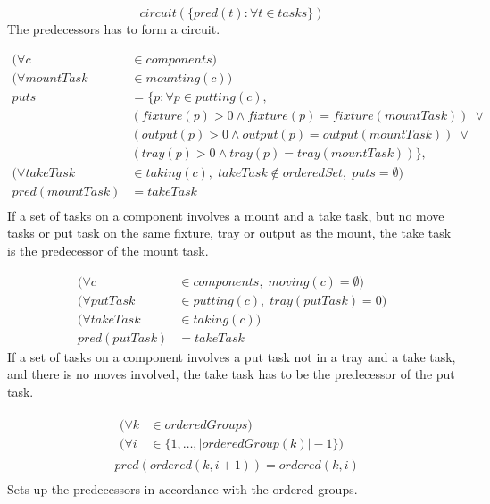  \begin{equation}\label{eq:111}
 circuit(\{pred(t) : \forall t \in tasks\})\end{equation}
 The predecessors has to form a circuit.
 
 \begin{equation}
 \begin{aligned}\label{eq:112}
 (\forall c &\in components) \\
 (\forall mountTask &\in mounting(c)) \\
 puts &= \{p : \forall p \in putting(c),\\
 &(fixture(p) > 0 \land fixture(p) = fixture(mountTask)) \; \lor  \\
 &(output(p) > 0 \land output(p) = output(mountTask)) \; \lor  \\
 &(tray(p) > 0 \land tray(p) = tray(mountTask))\}, \\
 (\forall takeTask &\in taking(c), \; takeTask \notin orderedSet, \; puts = \emptyset) \\
 pred(mountTask) &= takeTask \\
 \end{aligned}
 \end{equation}
 If a set of tasks on a component involves a mount and a take task, but no move tasks or put task on the same fixture, tray or output as the mount, the take task is the predecessor of the mount task.
 
 \begin{equation}
 \begin{aligned}\label{eq:113}
 (\forall c &\in components, \; moving(c) = \emptyset)\\
 (\forall putTask &\in putting(c), \; tray(putTask) = 0)\\
 (\forall takeTask &\in taking(c))\\
 pred(putTask) &= takeTask
 \end{aligned}
 \end{equation}
 If a set of tasks on a component involves a put task not in a tray and a take task, and there is no moves involved, the take task has to be the predecessor of the put task.
 
 \begin{equation}
 \begin{aligned}\label{eq:114}
 &\begin{aligned}
 (\forall k &\in orderedGroups) \\
 (\forall i &\in \{1 , \ldots , |orderedGroup(k)|-1\}) 
 \end{aligned}\\
 &pred(ordered(k, i + 1)) = ordered(k, i) \\
 \end{aligned}
 \end{equation}
 Sets up the predecessors in accordance with the ordered groups.
 

